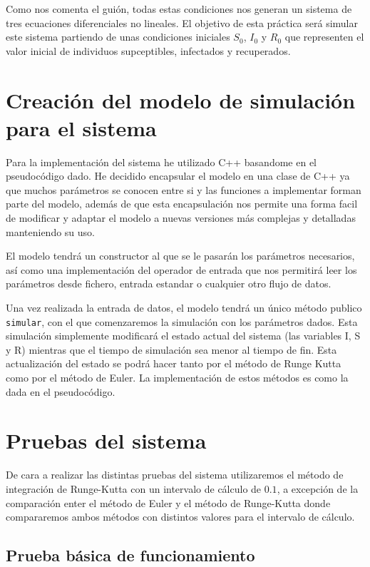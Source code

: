 \documentclass[12pt, spanish]{article}
\begin{document}
Como nos comenta el guión, todas estas condiciones nos generan un sistema de tres ecuaciones diferenciales no lineales. El objetivo de esta práctica será simular este sistema partiendo de unas condiciones iniciales $S_0$, $I_0$ y $R_0$ que representen el valor inicial de individuos supceptibles, infectados y recuperados.

\section{Creación del modelo de simulación para el sistema}

Para la implementación del sistema he utilizado C++ basandome en el pseudocódigo dado. He decidido encapsular el modelo en una clase de C++ ya que muchos parámetros se conocen entre si y las funciones a implementar forman parte del modelo, además de que esta encapsulación nos permite una forma facil de modificar y adaptar el modelo a nuevas versiones más complejas y detalladas manteniendo su uso.

El modelo tendrá un constructor al que se le pasarán los parámetros necesarios, así como una implementación del operador de entrada que nos permitirá leer los parámetros desde fichero, entrada estandar o cualquier otro flujo de datos.


Una vez realizada la entrada de datos, el modelo tendrá un único método publico \texttt{simular}, con el que comenzaremos la simulación con los parámetros dados. Esta simulación simplemente modificará el estado actual del sistema (las variables I, S y R) mientras que el tiempo de simulación sea menor al tiempo de fin. Esta actualización del estado se podrá hacer tanto por el método de Runge Kutta como por el método de Euler. La implementación de estos métodos es como la dada en el pseudocódigo.

\section{Pruebas del sistema}

De cara a realizar las distintas pruebas del sistema utilizaremos el método de integración de Runge-Kutta con un intervalo de cálculo de $0.1$, a excepción de la comparación enter el método de Euler y el método de Runge-Kutta donde compararemos ambos métodos con distintos valores para el intervalo de cálculo.

\subsection{Prueba básica de funcionamiento}
\end{document}
